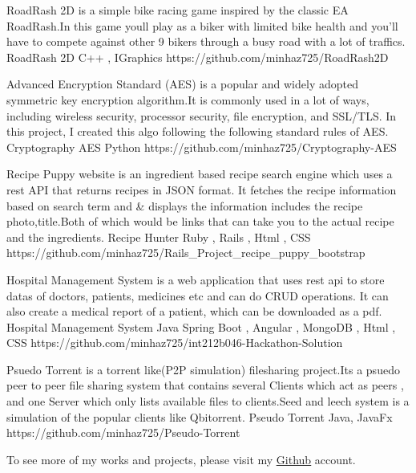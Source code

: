 \documentclass[]{awesome-cv}
\begin{document}
\begin{cventries}
	\cventry
	{RoadRash 2D is a simple bike racing game inspired by the classic EA RoadRash.In this game you\textquotesingle{}ll play as a biker with limited bike health and you'll have to compete against other 9 bikers through a busy road with a lot of traffics.}
	{RoadRash 2D}
	{C++ , IGraphics}
	{https://github.com/minhaz725/RoadRash2D}
	{}
	
	\vspace{-5mm}
	\cventry
	{Advanced Encryption Standard (AES) is a popular and widely adopted symmetric key encryption algorithm.It is commonly used in a lot of ways, including wireless security, processor security, file encryption, and SSL/TLS. In this project, I created this algo following the following standard rules of AES.}
	{Cryptography AES}
	{Python}
	{https://github.com/minhaz725/Cryptography-AES}
	{}
	
	\vspace{-5mm}
	\cventry
	{Recipe Puppy website is an ingredient based recipe search engine which uses a rest API that returns recipes in JSON format. It fetches the recipe information based on search term and \& displays the information includes the recipe photo,title.Both of which would be links that can take you to the actual recipe and the ingredients.}
	{Recipe Hunter}
	{Ruby , Rails , Html , CSS}
	{https://github.com/minhaz725/Rails\_Project\_recipe\_puppy\_bootstrap}
	{}
	
	
	\vspace{-5mm}
	\cventry
	{Hospital Management System is a web application that uses rest api to store datas of doctors, patients, medicines etc and can do CRUD operations. It can also create a medical report of a patient, which can be downloaded as a pdf.}
	{Hospital Management System}
	{Java Spring Boot , Angular , MongoDB , Html , CSS}
	{https://github.com/minhaz725/int212b046-Hackathon-Solution}
	{}
	
	\vspace{-5mm}
	\cventry
	{Psuedo Torrent is a torrent like(P2P simulation) filesharing project.It\textquotesingle{}s a psuedo peer to peer file sharing system that contains several \textquotedbl{}Clients\textquotedbl{} which act as peers , and one Server which only lists available files to clients.Seed and leech system is a simulation of the popular clients like Qbitorrent.}
	{Pseudo Torrent}
	{Java, JavaFx}
	{https://github.com/minhaz725/Pseudo-Torrent}
	{}
	
	\vspace{-5mm}
	
	\cventry
	{}
	{To see more of my works and projects, please visit my \href{https://github.com/minhaz725}{\underline{Github}} account. }
	{}
	{}
	{}
	
	\vspace{-5mm}
\end{cventries}

\ 
\end{document}
